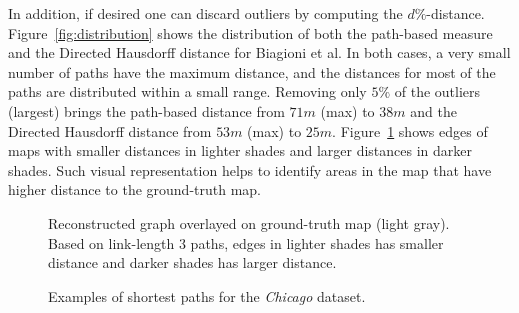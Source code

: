 \documentclass[natbib]{svjour3}                    \smartqed  \usepackage[table]{xcolor}
\begin{document}
In addition, if desired one can discard outliers by computing the $d\%$-distance. Figure~\ref{fig:distribution} shows the distribution of both the path-based measure and the Directed Hausdorff distance for Biagioni et al. In both cases, a very small number of paths have the maximum distance, and the distances for most of the paths are distributed within a small range. Removing only $5\%$ of the outliers (largest) brings the path-based distance from $71m$ (max) to $38m$ and the Directed Hausdorff distance from $53m$ (max) to $25m$. 
Figure~\ref{fig:rmapjames} shows edges of maps with smaller distances in lighter shades and larger distances in darker shades.
Such visual representation helps to identify areas in the map that have higher distance to the ground-truth map.


\begin{figure}[htbp]
\begin{center}

\end{center}
\vspace*{-2ex}
\caption{Reconstructed graph overlayed on ground-truth map (light gray). Based on link-length $3$ paths, edges in lighter shades has smaller distance and darker shades has larger distance.}
\label{fig:rmapjames}
\end{figure}
 

\begin{figure}[bthp]
\begin{center}
\hspace{0.05cm}
\hspace{0.05cm}
\hspace{0.05cm}
\end{center}
\caption{Examples of shortest paths for the \emph{Chicago} dataset.}
\label{fig:rn_sp_all}
\end{figure} 
\end{document}
